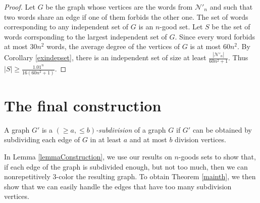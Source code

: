 \documentclass[a4paper,12pt]{article}
\begin{document}
\begin{proof}
Let $G$ be the graph whose vertices are the words from $\mathcal{N}'_n$ and such that two words share an edge if one of them forbids the other one. 
The set of words corresponding to any independent set of $G$ is an $n$-good set.
Let $S$ be the set of words corrsponding to the largest independent set of $G$.
Since every word forbids at most $30n^2$ words, the average degree of the vertices of $G$ is at most $60n^2$.
By Corollary \ref{exindepset}, there is an independent set of size at least $\frac{|\mathcal{N}'_n|}{60n^2+1}$.
Thus $|S|\ge \frac{1.01^{n}}{16(60n^2+1)}$.
\end{proof}

\section{The final construction}\label{secgraph}
A graph $G'$ is a \emph{$(\ge a,\le b)$-subdivision} of a graph $G$ if $G'$ can be obtained by subdividing each edge of $G$ in at least $a$ and at most $b$ division vertices.

In Lemma \ref{lemmaConstruction}, we use our results on $n$-goods sets to show that, if each edge of the graph is subdivided enough, but not too much, then we can nonrepetitively $3$-color the resulting graph. To obtain Theorem \ref{mainth}, we then show that we can easily handle the edges that have too many subdivision vertices.
\end{document}
